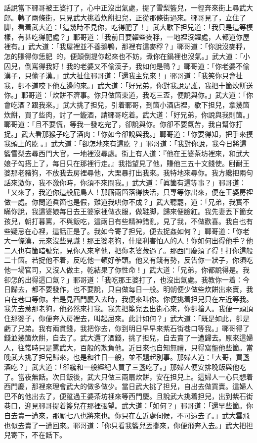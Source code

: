 話說當下鄆哥被王婆打了，心中正沒出氣處，提了雪梨籃兒，一徑奔來街上尋武大郎。轉了兩條街，只見武大挑着炊餅担兒，正從那條街過來。鄆哥見了，立住了脚，看着武大道：「這幾時不見你，吃得肥了！」武大歇下担兒道：「我只是這等模樣，有甚吃得肥處？」鄆哥道：「我前日要糴些麥稃，一地裡沒糴處，人都道你屋裡有。」武大道：「我屋裡並不養鵝鴨，那裡有這麥稃？」鄆哥道：「你說沒麥稃，怎的賺得你恁肥𦞂𦞂的，便顛倒提你起來也不妨，煮你在鍋裡也沒氣。」{}武大道：「小囚兒，倒罵得我好！我的老婆又不偷漢子，{}我如何是鴨？」鄆哥道：「你老婆不偷漢子，只偷子漢。」武大扯住鄆哥道：「還我主兒來！」鄆哥道：「我笑你只會扯我，卻不道咬下他左邊的來。」武大道：「好兄弟，你對我說是誰，我把十箇炊餅送你。」鄆哥道：「炊餅不濟事。你只做箇東道，我吃三盃，便說與你。」武大道：「你會吃酒？跟我來。」武大挑了担兒，引着鄆哥，到箇小酒店裡，歇下担兒，拿幾箇炊餅，買了些肉，討了一鏇酒，請鄆哥吃着。武大道：「好兄弟，你說與我則箇。」鄆哥道：「且不要慌，等我一發吃完了，卻說與你。你卻不要氣苦，我自幫你打捉。」武大看那猴子吃了酒肉：「你如今卻說與我。」鄆哥道：「你要得知，把手來摸我頭上的肐𦞂。」武大道：「卻怎地來有這肐𦞂？」鄆哥道：「我對你說，我今日將這籃雪梨去尋西門大官，一地裡沒尋處。街上有人道：『他在王婆茶坊裡來，和武大娘子勾搭上了，每日只在那裡行走。』我指望見了他，賺他三五十文錢使。尀耐王婆那老豬狗，不放我去房裡尋他，大栗暴打出我來。我特地來尋你。我方纔把兩句話來激你，我不激你時，你須不來問我。」武大道：「眞箇有這等事？」鄆哥道：「又來了，我道你這般屁鳥人！那厮兩箇落得快活，只專等你出來，便在王婆房裡做一處。你問道眞箇也是假，難道我哄你不成？」武大聽罷，道：「兄弟，我實不瞞你說，我這婆娘每日去王婆家裡做衣服，做鞋脚，歸來便臉紅。我先妻丟下箇女孩兒，朝打暮罵，不與飯吃，這兩日有些精神錯亂，見了我，不做歡喜。我自也有些疑忌在心裡，這話正是了。我如今寄了担兒，便去捉姦如何？」鄆哥道：「你老大一條漢，元來沒些見識！那王婆老狗，什麼利害怕人的人！你如何出得他手？他二人也有箇暗號兒，見你入來拿他，把你老婆藏過了。那西門慶須了得！打你這般二十箇。若捉他不着，反吃他一頓好拳頭。他又有錢有勢，反告你一狀子，你須吃他一場官司，又沒人做主，乾結果了你性命！」{}武大道：「兄弟，你都說得是。我卻怎的出得這口氣？」鄆哥道：「我吃那王婆打了，也沒出氣處。我教你一着：今日歸去，都不要發作，也不要說，只自做每日一般。明朝便少做些炊餅出來賣，我自在巷口等你。若是見西門慶入去時，我便來叫你。你便挑着担兒只在左近等我。我先去惹那老狗，他必然來打我。我先把籃兒丟出街心來，你卻搶入。我便一頭頂住那婆子，你便奔入房裡去，叫起屈來。此計如何？」武大道：「既是如此，卻是虧了兄弟。我有兩貫錢，我把你去，你到明日早早來紫石街巷口等我。」鄆哥得了錢並幾箇炊餅，自去了。武大還了酒錢，挑了担兒，自去賣了一遭歸去。原來這婦人，往常時只是罵武大，百般的欺負他。近日來也自知無禮，只得窩盤他些箇。{}當晚武大挑了担兒歸來，也是和往日一般，並不題起別事。那婦人道：「大哥，買盞酒吃？」武大道：「卻纔和一般經紀人買了三盞吃了。」那婦人便安排晚飯與他吃了。當夜無話。次日飯後，武大只做三兩扇炊餅，安在担兒上。這婦人一心只想着西門慶，那裡來理會武大的做多做少。當日武大挑了担兒，自出去做買賣。這婦人巴不的他出去了，便踅過王婆茶坊裡來等西門慶。且說武大挑着担兒，出到紫石街巷口，迎見鄆哥提着籃兒在那裡張望。{}武大道：「如何？」鄆哥道：「還早些箇。你自去賣一遭來，那厮七八也將來也。你只在左近處伺候，不可遠去了。」武大雲飛也似去賣了一遭回來。鄆哥道：「你只看我籃兒丟擲來，你便飛奔入去。」武大把担兒寄下，不在話下。

